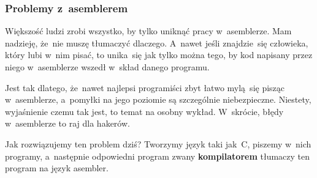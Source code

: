 \documentclass[10pt,t]{beamer}
\begin{document}
\begin{frame}
  \frametitle{Problemy z~asemblerem}


  Większość ludzi zrobi wszystko, by tylko uniknąć pracy w~asemblerze.
  Mam nadzieję, że~nie muszę tłumaczyć dlaczego.  A~nawet jeśli
  znajdzie~się człowieka, który lubi w~nim pisać, to unika~się jak tylko
  można tego, by kod napisany przez niego w~asemblerze wszedł w~skład
  danego programu.

  Jest tak dlatego, że~nawet najlepsi programiści zbyt łatwo mylą~się
  pisząc w~asemblerze, a~pomyłki na jego poziomie są szczególnie
  niebezpieczne. Niestety, wyjaśnienie czemu tak jest, to temat na osobny
  wykład. W~skrócie, błędy w~asemblerze to raj dla hakerów.

  Jak rozwiązujemy ten problem dziś? Tworzymy język taki jak~C, piszemy
  w~nich programy, a~następnie odpowiedni program zwany
  \textbf{kompilatorem} tłumaczy ten program na język asembler.

\end{frame}




















\end{document}
